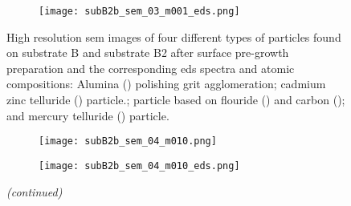 \begin{figure}[htbp]
\begin{subfigure}[t]{\textwidth}
          \hfill
          \begin{minipage}[t]{0.43\linewidth}
            \centering
            \texttt{[image: subB2b\_sem\_03\_m001\_eds.png]}
          \end{minipage}
          \begin{minipage}[t]{0.11\linewidth}
            \centering
            \atomicTable[\ce{F}&\SI{55.8}{}][\ce{C}&\SI{22.5}{}][\ce{Cd}&\SI{10.6}{}][\ce{Te}&\SI{10.4}{}][\ce{O}&\SI{0.4}{}][\ce{Zn}&\SI{0.2}{}][\ce{Si}&\SI{0.1}{}] %
          \end{minipage}
    \end{subfigure}
    \caption[\Ac{sem} images, \ac{eds} spectra, and \ac{eds} atomic compositions of four different types of particles found on substrate B and substrate B2 after surface pre-growth preparation.]{High resolution \ac{sem} images of four different types of particles found on substrate B and substrate B2 after surface pre-growth preparation and the corresponding \ac{eds} spectra and atomic compositions:  Alumina () polishing grit agglomeration;  cadmium zinc telluride () particle.;  particle based on flouride () and carbon (); and  mercury telluride () particle.}\label{fig:subBb_sem_w_eds}
\end{figure}
%
\begin{figure}[htbp]
\ContinuedFloat
    \centering
    \begin{subfigure}[t]{\textwidth}
        \caption{}\label{fig:subB2b_mct}
          \begin{minipage}[t]{0.43\linewidth}
            \centering
            \texttt{[image: subB2b\_sem\_04\_m010.png]}
          \end{minipage}
          \hfill
          \begin{minipage}[t]{0.43\linewidth}
            \centering
            \texttt{[image: subB2b\_sem\_04\_m010\_eds.png]}
          \end{minipage}
          \begin{minipage}[t]{0.11\linewidth}
            \centering
            \atomicTable[\ce{Te}&\SI{35.7}{}][\ce{Hg}&\SI{31.0}{}][\ce{C}&\SI{30.4}{}][\ce{Cd}&\SI{2.81}{}][\ce{Zn}&\SI{0.1}{}]%
          \end{minipage}
    \end{subfigure}
    \captionsetup{list=no}
    \caption{\emph{(continued)}}
\end{figure}

